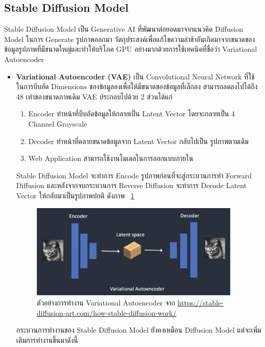 \documentclass[12pt,oneside,openright,a4paper]{cpe-thai-project}
\begin{document}
\subsection{Stable Diffusion Model}
\hspace {18pt} Stable Diffusion Model เป็น Generative AI ที่พัฒนาต่อยอดมาจากแนวคิด Diffusion Model ในการ Generate รูปภาพออกมา วัตถุประสงค์เพื่อแก้ไขความล่าช้าอันเกิดมาจากขนาดของข้อมูลรูปภาพที่มีขนาดใหญ่และทำให้บริโภค GPU อย่างมากด้วยการใช้เทคนิคที่ชื่อว่า Variational Autoencoder

\begin{itemize}

\item \textbf {Variational Autoencoder (VAE)}
เป็น Convolutional Neural Network ที่ใช้ในการบีบอัด Dimensions ของข้อมูลลงเพื่อให้มีขนาดของข้อมูลที่เล็กลง สามารถลดลงไปได้ถึง 48 เท่าของขนาดภาพเดิม VAE ประกอบไปด้วย 2 ส่วนได้แก่

\begin{enumerate}
\item Encoder ทำหน้าที่บีบอัดข้อมูลให้กลายเป็น Latent Vector โดยจะกลายเป็น 4  Channel Grayscale  
\item Decoder ทำหน้าที่คลายขนาดข้อมูลจาก Latent Vector กลับไปเป็น รูปภาพตามเดิม 
\item Web Application สามารถใช้งานโมเดลในการออกแบบภายใน 
\end{enumerate}

Stable Diffusion Model จะทำการ Encode รูปภาพก่อนที่จะสู่กระบวนการทำ Forward Diffusion และหลังจากจบกระบวนการ Reverse Diffusion จะทำการ Decode Latent Vector ให้กลับมาเป็นรูปภาพปกติ ดังภาพ ~\ref{fig:autoencoder}

\begin{figure}[!h]\centering
\includegraphics[width=10cm]{image/autoencoder.jpg}
\caption{ตัวอย่างการทำงาน Variational Autoencoder จาก \url{https://stable-diffusion-art.com/how-stable-diffusion-work/}}
\label{fig:autoencoder}
\end{figure}

กระบวนการทำงานของ Stable Diffusion Model ยังคงเหมือน  Diffusion Model แต่จะเพิ่มเติมการทำงานขึ้นมาดังนี้


\end{itemize}
\end{document}
